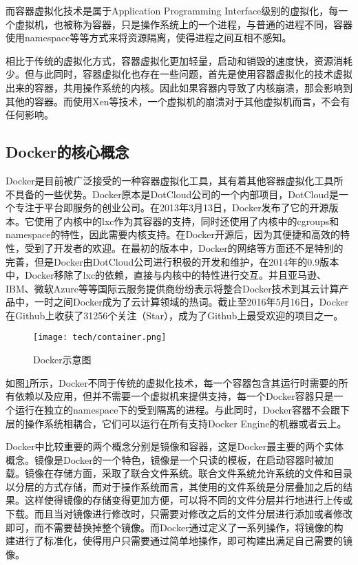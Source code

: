 而容器虚拟化技术是属于Application Programming Interface级别的虚拟化，每一个虚拟机，也被称为容器，只是操作系统上的一个进程，与普通的进程不同，容器使用namespace等等方式来将资源隔离，使得进程之间互相不感知。\cite{soltesz2007container}

相比于传统的虚拟化方式，容器虚拟化更加轻量，启动和销毁的速度快，资源消耗少。但与此同时，容器虚拟化也存在一些问题，首先是使用容器虚拟化的技术虚拟出来的容器，共用操作系统的内核。因此如果容器内导致了内核崩溃，那会影响到其他的容器。而使用Xen等技术，一个虚拟机的崩溃对于其他虚拟机而言，不会有任何影响。\cite{dua2014virtualization}

\subsection{Docker的核心概念}

Docker是目前被广泛接受的一种容器虚拟化工具，其有着其他容器虚拟化工具所不具备的一些优势。Docker原本是DotCloud公司的一个内部项目，DotCloud是一个专注于平台即服务的创业公司。在2013年3月13日，Docker发布了它的开源版本。它使用了内核中的lxc作为其容器的支持，同时还使用了内核中的cgroups和namespace的特性，因此需要内核支持。在Docker开源后，因为其便捷和高效的特性，受到了开发者的欢迎。在最初的版本中，Docker的网络等方面还不是特别的完善，但是Docker由DotCloud公司进行积极的开发和维护，在2014年的0.9版本中，Docker移除了lxc的依赖，直接与内核中的特性进行交互。并且亚马逊、IBM、微软Azure等等国际云服务提供商纷纷表示将整合Docker技术到其云计算产品中，一时之间Docker成为了云计算领域的热词。截止至2016年5月16日，Docker在Github上收获了31256个关注（Star），成为了Github上最受欢迎的项目之一。

\begin{figure}[!htp]
  \centering
  \texttt{[image: tech/container.png]}
  \caption{Docker示意图}
  \label{fig:container}
\end{figure}

如图\ref{fig:container}所示，Docker不同于传统的虚拟化技术，每一个容器包含其运行时需要的所有依赖以及应用，但并不需要一个虚拟机来提供支持，每一个Docker容器只是一个运行在独立的namespace下的受到隔离的进程。与此同时，Docker容器不会跟下层的操作系统相耦合，它们可以运行在所有支持Docker Engine的机器或者云上。

Docker中比较重要的两个概念分别是镜像和容器，这是Docker最主要的两个实体概念。镜像是Docker的一个特色，镜像是一个只读的模板，在启动容器时被加载。镜像在存储方面，采取了联合文件系统。联合文件系统允许系统的文件和目录以分层的方式存储，而对于操作系统而言，其使用的文件系统是分层叠加之后的结果。这样使得镜像的存储变得更加方便，可以将不同的文件分层并行地进行上传或下载。而且当对镜像进行修改时，只需要对修改之后的文件分层进行添加或者修改即可，而不需要替换掉整个镜像。而Docker通过定义了一系列操作，将镜像的构建进行了标准化，使得用户只需要通过简单地操作，即可构建出满足自己需要的镜像。\cite{mayue}

